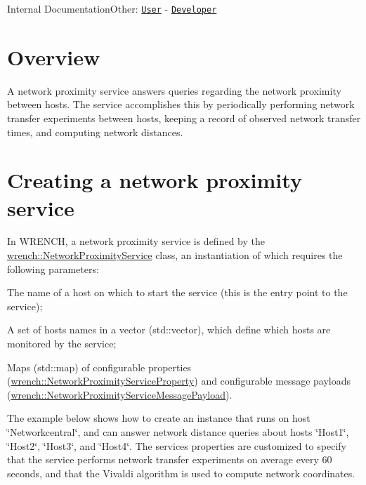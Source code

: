 Internal DocumentationOther\+: \href{../user/guide-networkproximity.html}{\tt User} -\/ \href{../developer/guide-networkproximity.html}{\tt Developer}\hypertarget{guide-networkproximity_guide-networkproximity-overview}{}\section{Overview}\label{guide-networkproximity_guide-networkproximity-overview}
A network proximity service answers queries regarding the network proximity between hosts. The service accomplishes this by periodically performing network transfer experiments between hosts, keeping a record of observed network transfer times, and computing network distances.\hypertarget{guide-networkproximity_guide-networkproximity-creating}{}\section{Creating a network proximity service}\label{guide-networkproximity_guide-networkproximity-creating}
In W\+R\+E\+N\+CH, a network proximity service is defined by the {\ttfamily \hyperlink{classwrench_1_1_network_proximity_service}{wrench\+::\+Network\+Proximity\+Service}} class, an instantiation of which requires the following parameters\+:


\begin{DoxyItemize}
\item The name of a host on which to start the service (this is the entry point to the service);
\item A set of hosts names in a vector ({\ttfamily std\+::vector}), which define which hosts are monitored by the service;
\item Maps ({\ttfamily std\+::map}) of configurable properties ({\ttfamily \hyperlink{classwrench_1_1_network_proximity_service_property}{wrench\+::\+Network\+Proximity\+Service\+Property}}) and configurable message payloads ({\ttfamily \hyperlink{classwrench_1_1_network_proximity_service_message_payload}{wrench\+::\+Network\+Proximity\+Service\+Message\+Payload}}).
\end{DoxyItemize}

The example below shows how to create an instance that runs on host \char`\"{}\+Networkcentral\char`\"{}, and can answer network distance queries about hosts \char`\"{}\+Host1\char`\"{}, \char`\"{}\+Host2\char`\"{}, \char`\"{}\+Host3\char`\"{}, and \char`\"{}\+Host4\char`\"{}. The service\textquotesingle{}s properties are customized to specify that the service performs network transfer experiments on average every 60 seconds, and that the Vivaldi algorithm is used to compute network coordinates.


